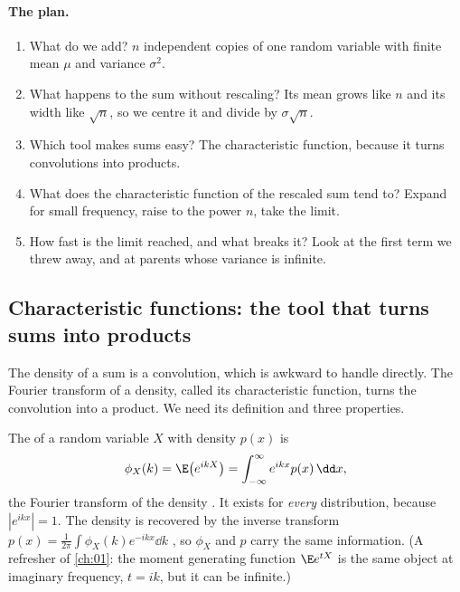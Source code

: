 \paragraph{The plan.}
\begin{enumerate}[label=\arabic*.]
  \item What do we add? $n$ independent copies of one random variable with finite mean $\mu$ and variance $\sigma^2$.
  \item What happens to the sum without rescaling? Its mean grows like $n$ and its width like $\sqrt n$, so we centre it and divide by $\sigma\sqrt n$.
  \item Which tool makes sums easy? The characteristic function, because it turns convolutions into products.
  \item What does the characteristic function of the rescaled sum tend to? Expand for small frequency, raise to the power $n$, take the limit.
  \item How fast is the limit reached, and what breaks it? Look at the first term we threw away, and at parents whose variance is infinite.
\end{enumerate}

\subsection{Characteristic functions: the tool that turns sums into products}
\label{2b:sec:cf}

The density of a sum is a convolution, which is awkward to handle directly. The Fourier transform of a density, called its characteristic function, turns the convolution into a product. We need its definition and three properties.

\begin{workdef}
The  of a random variable $X$ with density $p(x)$ is
\begin{equation}
  \phi_X(k)=\E\bigl(e^{ikX}\bigr)=\int_{-\infty}^{\infty}e^{ikx}p(x)\,\dd x ,
  \label{2b:eq:cf}
\end{equation}
the Fourier transform of the density  . It exists for \emph{every} distribution, because $|e^{ikx}|=1$. The density is recovered by the inverse transform $p(x)=\frac{1}{2\pi}\int\phi_X(k)e^{-ikx}\dd k$ , so $\phi_X$ and $p$ carry the same information. (A refresher of \cref{ch:01}: the moment generating function $\E e^{tX}$ is the same object at imaginary frequency, $t=ik$, but it can be infinite.)
\end{workdef}

